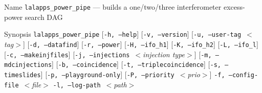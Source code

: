 \documentclass{article}
\newcommand{\prog}[1]{\texttt{#1}}
\newcommand{\option}[1]{\texttt{#1}}
\newcommand{\parm}[1]{$<$\textit{#1}$>$}
\newenvironment{entry}%
  {\begin{list}{}{\renewcommand{\makelabel}[1]%
    {\parbox[b]{\labelwidth}{\makebox[0pt][l]{\textbf{##1}}\\}}%
    \setlength{\labelwidth}{1em}%
    \setlength{\labelsep}{1em}%
    \setlength{\leftmargin}{2em}%
    \setlength{\topsep}{\medskipamount}%
    \setlength{\itemsep}{\medskipamount}%
    \setlength{\parsep}{\medskipamount}%
    \setlength{\listparindent}{0pt}}}
  {\end{list}}
\begin{document}
\begin{entry}

\item[Name]
\prog{lalapps\_power\_pipe} --- builds a one/two/three interferometer excess-power
search DAG   

\item[Synopsis]
\prog{lalapps\_power\_pipe} \newline \hspace*{0.5in}
[\option{-h, --help}] \newline \hspace*{0.5in}
[\option{-v, --version}] \newline \hspace*{0.5in}
[\option{-u, --user-tag}~\parm{tag}] \newline \hspace*{0.5in}
[\option{-d, --datafind}] \newline \hspace*{0.5in}
[\option{-r, --power}] \newline \hspace*{0.5in}
[\option{-H, --ifo\_h1}] \newline \hspace*{0.5in}
[\option{-K, --ifo\_h2}] \newline \hspace*{0.5in}
[\option{-L, --ifo\_l}] \newline \hspace*{0.5in}
[\option{-c, --makeinjfiles}] \newline \hspace*{0.5in}
[\option{-j, --injections}~\parm{injection type}] \newline \hspace*{0.5in}
[\option{-m, --mdcinjections}] \newline \hspace*{0.5in}
[\option{-b, --coincidence}] \newline \hspace*{0.5in}
[\option{-t, --triplecoincidence}] \newline \hspace*{0.5in}
[\option{-s, --timeslides}] \newline \hspace*{0.5in}
[\option{-p, --playground-only}] \newline \hspace*{0.5in}
[\option{-P, --priority}~\parm{prio}] \newline \hspace*{0.5in}
\option{-f, --config-file}~\parm{file} \newline \hspace*{0.5in}
\option{-l, --log-path}~\parm{path}


\end{entry}
\end{document}
